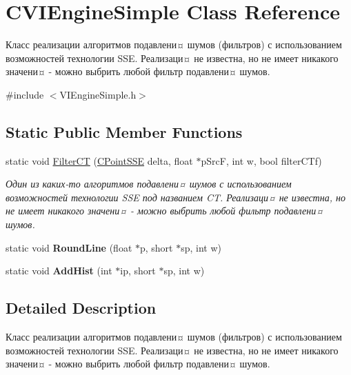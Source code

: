 \hypertarget{class_c_v_i_engine_simple}{\section{C\+V\+I\+Engine\+Simple Class Reference}
\label{class_c_v_i_engine_simple}
}


Класс реализации алгоритмов подавлени¤ шумов (фильтров) с использованием возможностей технологии S\+S\+E. Реализаци¤ не известна, но не имеет никакого значени¤ -\/ можно выбрить любой фильтр подавлени¤ шумов.  




{\ttfamily \#include $<$V\+I\+Engine\+Simple.\+h$>$}

\subsection*{Static Public Member Functions}
\begin{DoxyCompactItemize}
\item 
static void \hyperlink{class_c_v_i_engine_simple_a2b0441394c18c07d7d90fb13998c0355}{Filter\+C\+T} (\hyperlink{class_c_point_s_s_e}{C\+Point\+S\+S\+E} delta, float $\ast$p\+Src\+F, int w, bool filter\+C\+Tf)
\begin{DoxyCompactList}\small\item\em Один из каких-\/то алгоритмов подавлени¤ шумов с использованием возможностей технологии S\+S\+E под названием C\+T. Реализаци¤ не известна, но не имеет никакого значени¤ -\/ можно выбрить любой фильтр подавлени¤ шумов. \end{DoxyCompactList}\item 
\hypertarget{class_c_v_i_engine_simple_a607ec0a835e39493e7d5271ad1ff1b4c}{static void {\bfseries Round\+Line} (float $\ast$p, short $\ast$sp, int w)}\label{class_c_v_i_engine_simple_a607ec0a835e39493e7d5271ad1ff1b4c}

\item 
\hypertarget{class_c_v_i_engine_simple_a41c72e5c5e19dfbd2a7e97c7ec4952c2}{static void {\bfseries Add\+Hist} (int $\ast$ip, short $\ast$sp, int w)}\label{class_c_v_i_engine_simple_a41c72e5c5e19dfbd2a7e97c7ec4952c2}

\end{DoxyCompactItemize}


\subsection{Detailed Description}
Класс реализации алгоритмов подавлени¤ шумов (фильтров) с использованием возможностей технологии S\+S\+E. Реализаци¤ не известна, но не имеет никакого значени¤ -\/ можно выбрить любой фильтр подавлени¤ шумов. 



